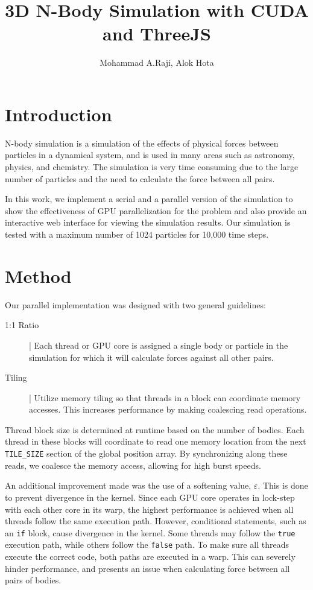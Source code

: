 \documentclass[11pt,a4paper]{article}
\author{Mohammad A.Raji, Alok Hota}
\title{3D N-Body Simulation with CUDA and ThreeJS}
\begin{document}
	\maketitle
	
	\section{Introduction}
	N-body simulation is a simulation of the effects of physical forces between particles in a dynamical system, and is used in many areas such as astronomy, physics, and chemistry. The simulation is very time consuming due to the large number of particles and the need to calculate the force between all pairs. 
	
	In this work, we implement a serial and a parallel version of the simulation to show the effectiveness of GPU parallelization for the problem and also provide an interactive web interface for viewing the simulation results. Our simulation is tested with a maximum number of 1024 particles for 10,000 time steps. 
	
	\section{Method}
	Our parallel implementation was designed with two general guidelines:
	\begin{description}
		\item[1:1 Ratio] | Each thread or GPU core is assigned a single body or particle in the simulation for which it will calculate forces against all other pairs.
		\item[Tiling] | Utilize memory tiling so that threads in a block can coordinate memory accesses. This increases performance by making coalescing read operations.
	\end{description}
	Thread block size is determined at runtime based on the number of bodies. Each thread in these blocks will coordinate to read one memory location from the next \texttt{TILE\_SIZE} section of the global position array. By synchronizing along these reads, we coalesce the memory access, allowing for high burst speeds.
	
	An additional improvement made was the use of a softening value, $\varepsilon$. This is done to prevent divergence in the kernel. Since each GPU core operates in lock-step with each other core in its warp, the highest performance is achieved when all threads follow the same execution path. However, conditional statements, such as an \texttt{if} block, cause divergence in the kernel. Some threads may follow the \texttt{true} execution path, while others follow the \texttt{false} path. To make sure all threads execute the correct code, both paths are executed in a warp. This can severely hinder performance, and presents an issue when calculating force between all pairs of bodies.
	
\end{document}
